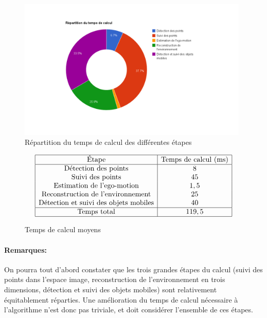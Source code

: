 \begin{figure}
	\centering
	\includegraphics[width=0.98\textwidth]{Chapter6/graphics/repartition_temps_calcul.png}
	\caption{Répartition du temps de calcul des différentes étapes}
	\label{fig:ch6_repartition_calcul}
\end{figure}

\begin{figure}
	\renewcommand{\arraystretch}{1.2}
	
	\begin{equation}
	\begin{array} {| c | c |}
	\hline
	\textnormal{Étape} & \textnormal{Temps de calcul (ms)} \\
	\hline
	\textnormal{Détection des points} 									& 8 	\\
	\textnormal{Suivi des points} 											& 45 	\\
	\textnormal{Estimation de l'ego-motion}							& 1,5		\\
	\textnormal{Reconstruction de l'environnement} 			& 25		\\
	\textnormal{Détection et suivi des objets mobiles} 	& 40		\\
	\hline
	\textnormal{Temps total} & 119,5\\
	\hline
	\end{array}
	\end{equation}
	\caption{Temps de calcul moyens}
	\label{tab:ch6_temps_de_calcul}
\end{figure}

\paragraph{Remarques:\\}
On pourra tout d'abord constater que les trois grandes étapes du calcul (suivi des points dans l'espace image, reconstruction de l'environnement en trois dimensions, détection et suivi des objets mobiles) sont relativement équitablement réparties. Une amélioration du temps de calcul nécessaire à l'algorithme n'est donc pas triviale, et doit considérer l'ensemble de ces étapes.\\

